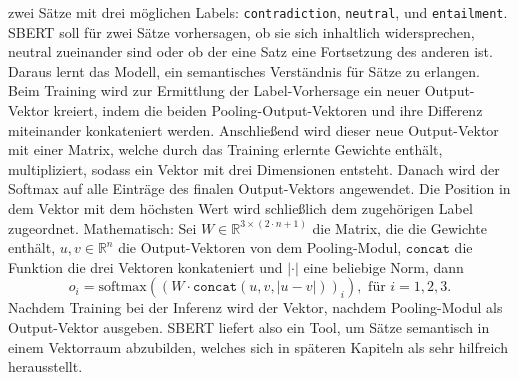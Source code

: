 \documentclass[12pt,letterpaper,ngerman]{article}
\begin{document}
zwei Sätze mit drei möglichen Labels: 
\verb|contradiction|, \verb|neutral|, und \verb|entailment|.
SBERT soll für zwei Sätze vorhersagen, ob sie sich inhaltlich
widersprechen, neutral zueinander sind oder ob der eine Satz
eine Fortsetzung des anderen ist. Daraus lernt das Modell,
ein semantisches Verständnis für Sätze zu erlangen.\\
Beim Training wird zur Ermittlung der Label-Vorhersage ein 
neuer Output-Vektor kreiert, indem die beiden 
Pooling-Output-Vektoren und ihre Differenz miteinander 
konkateniert werden.
Anschließend wird dieser neue Output-Vektor mit einer Matrix,
welche durch das Training erlernte Gewichte enthält, multipliziert, 
sodass ein Vektor mit drei Dimensionen entsteht.
Danach wird der Softmax auf alle Einträge des finalen 
Output-Vektors angewendet. Die Position in dem Vektor mit dem 
höchsten Wert wird schließlich dem zugehörigen Label zugeordnet.
Mathematisch:
Sei $W \in \mathbb{R}^{3 \times (2\cdot n + 1)}$ die Matrix,
die die Gewichte enthält, 
$u,v \in \mathbb{R}^n$ die Output-Vektoren von dem Pooling-Modul,
$\texttt{concat}$ die Funktion die drei Vektoren konkateniert und
$|\cdot|$ eine beliebige Norm, dann
\[
  o_i = \text{softmax}((W \cdot \texttt{concat}(u,v, |u-v|))_i), \text{ für } i = 1, 2, 3.
\]
Nachdem Training bei der Inferenz wird der Vektor, nachdem 
Pooling-Modul als Output-Vektor ausgeben. SBERT liefert 
also ein Tool, um Sätze semantisch in einem Vektorraum abzubilden,
welches sich in späteren Kapiteln als sehr hilfreich herausstellt.
\end{document}
